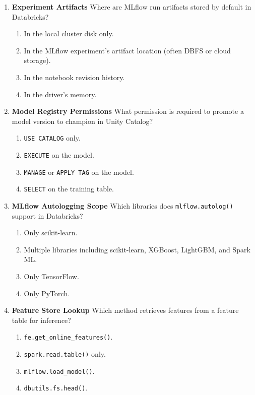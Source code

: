 \documentclass{article}
\begin{document}
\begin{enumerate}[label=\textbf{Q\arabic*.}]
		\item \textbf{Experiment Artifacts}
		Where are MLflow run artifacts stored by default in Databricks?
		\begin{enumerate}[label=\Alph*.]
			\item In the local cluster disk only.
			\item In the MLflow experiment's artifact location (often DBFS or cloud storage).
			\item In the notebook revision history.
			\item In the driver's memory.
		\end{enumerate}
		
		\item \textbf{Model Registry Permissions}
		What permission is required to promote a model version to champion in Unity Catalog?
		\begin{enumerate}[label=\Alph*.]
			\item \texttt{USE CATALOG} only.
			\item \texttt{EXECUTE} on the model.
			\item \texttt{MANAGE} or \texttt{APPLY TAG} on the model.
			\item \texttt{SELECT} on the training table.
		\end{enumerate}
		
		\item \textbf{MLflow Autologging Scope}
		Which libraries does \texttt{mlflow.autolog()} support in Databricks?
		\begin{enumerate}[label=\Alph*.]
			\item Only scikit-learn.
			\item Multiple libraries including scikit-learn, XGBoost, LightGBM, and Spark ML.
			\item Only TensorFlow.
			\item Only PyTorch.
		\end{enumerate}
		
		\item \textbf{Feature Store Lookup}
		Which method retrieves features from a feature table for inference?
		\begin{enumerate}[label=\Alph*.]
			\item \texttt{fe.get\_online\_features()}.
			\item \texttt{spark.read.table()} only.
			\item \texttt{mlflow.load\_model()}.
			\item \texttt{dbutils.fs.head()}.
		\end{enumerate}
		

\end{enumerate}
\end{document}
